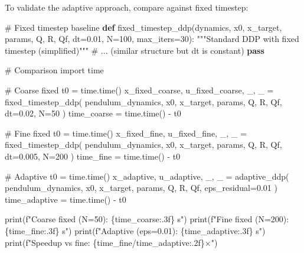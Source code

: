 \documentclass[
  letterpaper,
  DIV=11,
  numbers=noendperiod]{scrartcl}
\newenvironment{Shaded}{\begin{snugshade}}{\end{snugshade}}
\newcommand{\BuiltInTok}[1]{\textcolor[rgb]{0.00,0.23,0.31}{#1}}
\newcommand{\CommentTok}[1]{\textcolor[rgb]{0.37,0.37,0.37}{#1}}
\newcommand{\ControlFlowTok}[1]{\textcolor[rgb]{0.00,0.23,0.31}{\textbf{#1}}}
\newcommand{\DecValTok}[1]{\textcolor[rgb]{0.68,0.00,0.00}{#1}}
\newcommand{\FloatTok}[1]{\textcolor[rgb]{0.68,0.00,0.00}{#1}}
\newcommand{\ImportTok}[1]{\textcolor[rgb]{0.00,0.46,0.62}{#1}}
\newcommand{\KeywordTok}[1]{\textcolor[rgb]{0.00,0.23,0.31}{\textbf{#1}}}
\newcommand{\NormalTok}[1]{\textcolor[rgb]{0.00,0.23,0.31}{#1}}
\newcommand{\OperatorTok}[1]{\textcolor[rgb]{0.37,0.37,0.37}{#1}}
\newcommand{\SpecialCharTok}[1]{\textcolor[rgb]{0.37,0.37,0.37}{#1}}
\newcommand{\SpecialStringTok}[1]{\textcolor[rgb]{0.13,0.47,0.30}{#1}}
\begin{document}
To validate the adaptive approach, compare against fixed timestep:

\begin{Shaded}
\begin{Highlighting}[]
\CommentTok{\# Fixed timestep baseline}
\KeywordTok{def}\NormalTok{ fixed\_timestep\_ddp(dynamics, x0, x\_target, params, Q, R, Qf,}
\NormalTok{                       dt}\OperatorTok{=}\FloatTok{0.01}\NormalTok{, N}\OperatorTok{=}\DecValTok{100}\NormalTok{, max\_iters}\OperatorTok{=}\DecValTok{30}\NormalTok{):}
    \CommentTok{"""Standard DDP with fixed timestep (simplified)"""}
    \CommentTok{\# ... (similar structure but dt is constant)}
    \ControlFlowTok{pass}

\CommentTok{\# Comparison}
\ImportTok{import}\NormalTok{ time}

\CommentTok{\# Coarse fixed}
\NormalTok{t0 }\OperatorTok{=}\NormalTok{ time.time()}
\NormalTok{x\_fixed\_coarse, u\_fixed\_coarse, \_, \_ }\OperatorTok{=}\NormalTok{ fixed\_timestep\_ddp(}
\NormalTok{    pendulum\_dynamics, x0, x\_target, params, Q, R, Qf,}
\NormalTok{    dt}\OperatorTok{=}\FloatTok{0.02}\NormalTok{, N}\OperatorTok{=}\DecValTok{50}
\NormalTok{)}
\NormalTok{time\_coarse }\OperatorTok{=}\NormalTok{ time.time() }\OperatorTok{{-}}\NormalTok{ t0}

\CommentTok{\# Fine fixed}
\NormalTok{t0 }\OperatorTok{=}\NormalTok{ time.time()}
\NormalTok{x\_fixed\_fine, u\_fixed\_fine, \_, \_ }\OperatorTok{=}\NormalTok{ fixed\_timestep\_ddp(}
\NormalTok{    pendulum\_dynamics, x0, x\_target, params, Q, R, Qf,}
\NormalTok{    dt}\OperatorTok{=}\FloatTok{0.005}\NormalTok{, N}\OperatorTok{=}\DecValTok{200}
\NormalTok{)}
\NormalTok{time\_fine }\OperatorTok{=}\NormalTok{ time.time() }\OperatorTok{{-}}\NormalTok{ t0}

\CommentTok{\# Adaptive}
\NormalTok{t0 }\OperatorTok{=}\NormalTok{ time.time()}
\NormalTok{x\_adaptive, u\_adaptive, \_, \_ }\OperatorTok{=}\NormalTok{ adaptive\_ddp(}
\NormalTok{    pendulum\_dynamics, x0, x\_target, params, Q, R, Qf,}
\NormalTok{    eps\_residual}\OperatorTok{=}\FloatTok{0.01}
\NormalTok{)}
\NormalTok{time\_adaptive }\OperatorTok{=}\NormalTok{ time.time() }\OperatorTok{{-}}\NormalTok{ t0}

\BuiltInTok{print}\NormalTok{(}\SpecialStringTok{f"Coarse fixed (N=50):  }\SpecialCharTok{\{}\NormalTok{time\_coarse}\SpecialCharTok{:.3f\}}\SpecialStringTok{ s"}\NormalTok{)}
\BuiltInTok{print}\NormalTok{(}\SpecialStringTok{f"Fine fixed (N=200):   }\SpecialCharTok{\{}\NormalTok{time\_fine}\SpecialCharTok{:.3f\}}\SpecialStringTok{ s"}\NormalTok{)}
\BuiltInTok{print}\NormalTok{(}\SpecialStringTok{f"Adaptive (eps=0.01):  }\SpecialCharTok{\{}\NormalTok{time\_adaptive}\SpecialCharTok{:.3f\}}\SpecialStringTok{ s"}\NormalTok{)}
\BuiltInTok{print}\NormalTok{(}\SpecialStringTok{f"Speedup vs fine:      }\SpecialCharTok{\{}\NormalTok{time\_fine}\OperatorTok{/}\NormalTok{time\_adaptive}\SpecialCharTok{:.2f\}}\SpecialStringTok{×"}\NormalTok{)}
\end{Highlighting}
\end{Shaded}
\end{document}
